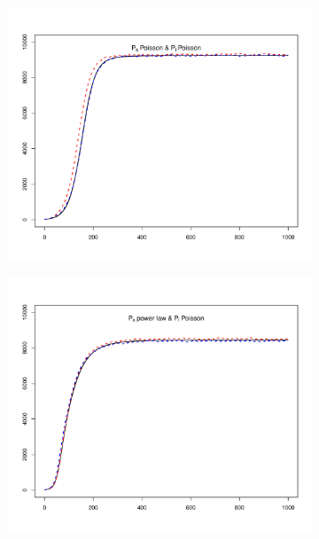 \begin{figure}[hbtp]
    \centering
    \begin{subfigure}[b]{0.45\textwidth}
        \centering
          \includegraphics[width=\textwidth, trim=30 20 30 20, clip]{../img/sis_00.pdf}
    \end{subfigure}
    \hspace{0.08\textwidth}
    \begin{subfigure}[b]{0.45\textwidth}
        \centering
          \includegraphics[width=\textwidth, trim=30 20 30 20, clip]{../img/sis_10.pdf}

\end{subfigure}
\end{figure}
